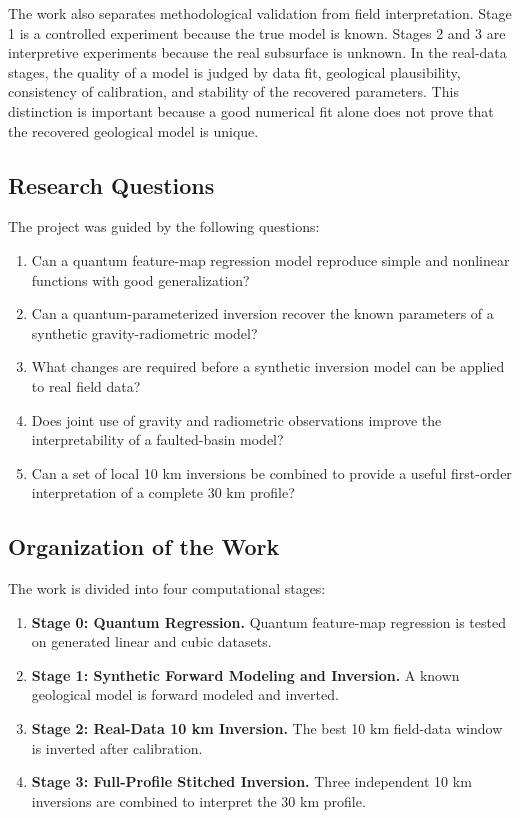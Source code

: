 \documentclass[12pt,a4paper]{article}
\begin{document}
The work also separates methodological validation from field interpretation. Stage 1 is a controlled experiment because the true model is known. Stages 2 and 3 are interpretive experiments because the real subsurface is unknown. In the real-data stages, the quality of a model is judged by data fit, geological plausibility, consistency of calibration, and stability of the recovered parameters. This distinction is important because a good numerical fit alone does not prove that the recovered geological model is unique.

\subsection{Research Questions}
The project was guided by the following questions:
\begin{enumerate}
    \item Can a quantum feature-map regression model reproduce simple and nonlinear functions with good generalization?
    \item Can a quantum-parameterized inversion recover the known parameters of a synthetic gravity-radiometric model?
    \item What changes are required before a synthetic inversion model can be applied to real field data?
    \item Does joint use of gravity and radiometric observations improve the interpretability of a faulted-basin model?
    \item Can a set of local 10 km inversions be combined to provide a useful first-order interpretation of a complete 30 km profile?
\end{enumerate}

\subsection{Organization of the Work}
The work is divided into four computational stages:
\begin{enumerate}
    \item \textbf{Stage 0: Quantum Regression.} Quantum feature-map regression is tested on generated linear and cubic datasets.
    \item \textbf{Stage 1: Synthetic Forward Modeling and Inversion.} A known geological model is forward modeled and inverted.
    \item \textbf{Stage 2: Real-Data 10 km Inversion.} The best 10 km field-data window is inverted after calibration.
    \item \textbf{Stage 3: Full-Profile Stitched Inversion.} Three independent 10 km inversions are combined to interpret the 30 km profile.
\end{enumerate}
\end{document}
